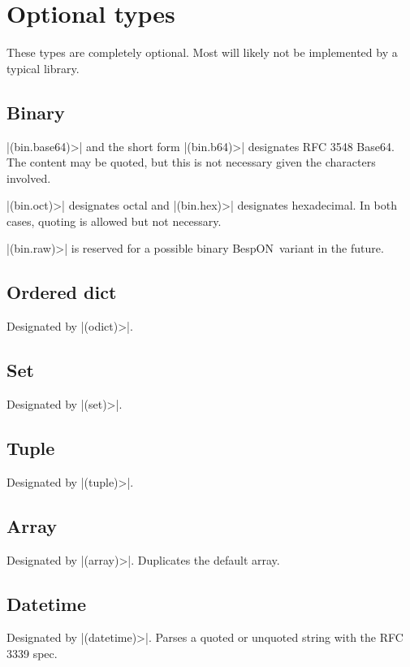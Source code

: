 \documentclass[11pt]{article}
\newcommand{\bespon}{BespON}
\begin{document}
\section{Optional types}

These types are completely optional.  Most will likely not be implemented by a typical library.

\subsection{Binary}

|(bin.base64)>| and the short form |(bin.b64)>| designates RFC 3548 Base64.  The content may be quoted, but this is not necessary given the characters involved.

|(bin.oct)>| designates octal and |(bin.hex)>| designates hexadecimal.  In both cases, quoting is allowed but not necessary.

|(bin.raw)>| is reserved for a possible binary \bespon\ variant in the future.

\subsection{Ordered dict}

Designated by |(odict)>|.

\subsection{Set}

Designated by |(set)>|.

\subsection{Tuple}

Designated by |(tuple)>|.


\subsection{Array}

Designated by |(array)>|.  Duplicates the default array.

\subsection{Datetime}

Designated by |(datetime)>|.  Parses a quoted or unquoted string with the RFC 3339 spec.
\end{document}
